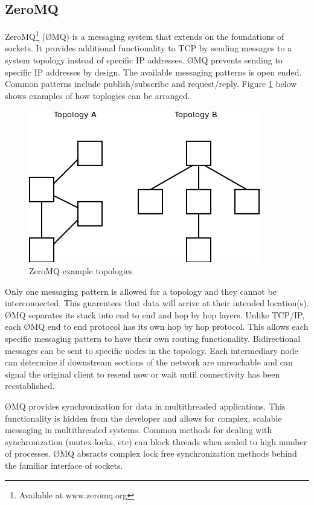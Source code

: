 \subsection{ZeroMQ}

ZeroMQ\footnote{Available at www.zeromq.org} (ØMQ) is a messaging system that extends on the foundations of sockets. It provides additional functionality to TCP by sending messages to a system topology instead of specific IP addresses. ØMQ prevents sending to specific IP addresses by design. The available messaging patterns is open ended. Common patterns include publish/subscribe and request/reply. Figure \ref{fig:zmq top} below shows examples of how toplogies can be arranged.

\begin{figure}[thpb]
 \centering
 \includegraphics[width=1.0\columnwidth]{./images/zmqtopology.png}
  \caption{ZeroMQ example topologies}
  \label{fig:zmq top}
\end{figure} 

Only one messaging pattern is allowed for a topology and they cannot be interconnected. This guarentees that data will arrive at their intended location(s). ØMQ separates its stack into end to end and hop by hop layers. Unlike TCP/IP, each ØMQ end to end protocol has its own hop by hop protocol\cite{ZMQTHEORY}. This allows each specific messaging pattern to have their own routing functionality. Bidirectional messages can be sent to specific nodes in the topology. Each intermediary node can determine if downstream sections of the network are unreachable and can signal the original client to resend now or wait until connectivity has been reestablished. 

ØMQ provides synchronization for data in multithreaded applications. This functionality is hidden from the developer and allows for complex, scalable messaging in multithreaded systems. Common methods for dealing with synchronization (mutex locks, etc) can block threads when scaled to high number of processes. ØMQ absracts complex lock free synchronization methods behind the familiar interface of sockets\cite{MULTITHREADZMQ}.

